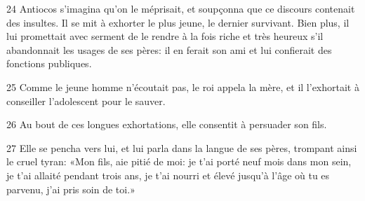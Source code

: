 24 Antiocos s’imagina qu’on le méprisait, et soupçonna que ce discours contenait des insultes. Il se mit à exhorter le plus jeune, le dernier survivant. Bien plus, il lui promettait avec serment de le rendre à la fois riche et très heureux s’il abandonnait les usages de ses pères: il en ferait son ami et lui confierait des fonctions publiques.

25 Comme le jeune homme n’écoutait pas, le roi appela la mère, et il l’exhortait à conseiller l’adolescent pour le sauver.

26 Au bout de ces longues exhortations, elle consentit à persuader son fils.

27 Elle se pencha vers lui, et lui parla dans la langue de ses pères, trompant ainsi le cruel tyran: «Mon fils, aie pitié de moi: je t’ai porté neuf mois dans mon sein, je t’ai allaité pendant trois ans, je t’ai nourri et élevé jusqu’à l’âge où tu es parvenu, j’ai pris soin de toi.»
